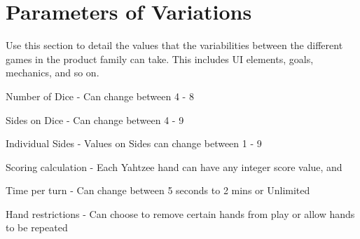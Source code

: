 \section{Parameters of Variations}

Use this section to detail the values that the variabilities between the different games in the product family can take. This includes UI elements, goals, mechanics, and so on.

Number of Dice - Can change between 4 - 8

Sides on Dice - Can change between 4 - 9

Individual Sides - Values on Sides can change between 1 - 9

Scoring calculation - Each Yahtzee hand can have any integer score value, and 

Time per turn - Can change between 5 seconds to 2 mins or Unlimited

Hand restrictions - Can choose to remove certain hands from play or allow hands to be repeated